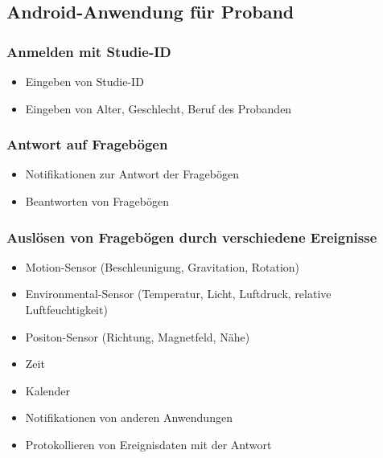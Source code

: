 \documentclass[a4paper]{scrreprt}
\begin{document}
            \subsection{Android-Anwendung f\"ur Proband}

                \subsubsection{Anmelden mit Studie-ID}
                    \begin{itemize}
                        \item Eingeben von Studie-ID
                        \item Eingeben von Alter, Geschlecht, Beruf des Probanden
                    \end{itemize}

                \subsubsection{Antwort auf Frageb\"ogen}
                    \begin{itemize}
                        \item Notifikationen zur Antwort der Frageb\"ogen
                        \item Beantworten von Frageb\"ogen
                    \end{itemize}

                \subsubsection{Auslösen von Frageb\"ogen durch verschiedene Ereignisse}
                    \begin{itemize}
                        \item Motion-Sensor (Beschleunigung, Gravitation, Rotation)
                        \item Environmental-Sensor (Temperatur, Licht, Luftdruck, relative Luftfeuchtigkeit)
                        \item Positon-Sensor (Richtung, Magnetfeld, Nähe)
                        \item Zeit
                        \item Kalender
                        \item Notifikationen von anderen Anwendungen
                        \item Protokollieren von Ereignisdaten mit der Antwort
                    \end{itemize}
\end{document}
